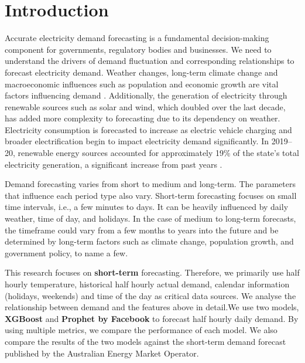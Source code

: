 \documentclass[mstat,12pt]{unswthesis}
\begin{document}


\afterpreface





%
%






\chapter{Introduction}\label{introduction}

Accurate electricity demand forecasting is a fundamental decision-making
component for governments, regulatory bodies and businesses. We need to
understand the drivers of demand fluctuation and corresponding
relationships to forecast electricity demand. Weather changes, long-term
climate change and macroeconomic influences such as population and
economic growth are vital factors influencing demand \cite{a2024_nem}.
Additionally, the generation of electricity through renewable sources
such as solar and wind, which doubled over the last decade, has added
more complexity to forecasting due to its dependency on
weather. Electricity
consumption is forecasted to increase as electric vehicle charging and
broader electrification begin to impact electricity demand
significantly. In 2019--20, renewable energy sources accounted for
approximately 19\% of the state's total electricity generation, a
significant increase from past years
\cite{nsw_epa_2021_energy_consumption}.

Demand forecasting varies from short to medium and long-term. The
parameters that influence each period type also vary. Short-term
forecasting focuses on small time intervals, i.e., a few minutes to
days. It can be heavily influenced by daily weather, time of day, and
holidays. In the case of medium to long-term forecasts, the timeframe
could vary from a few months to years into the future and be determined
by long-term factors such as climate change, population growth, and
government policy, to name a few.

This research focuses on \textbf{short-term} forecasting. Therefore, we
primarily use half hourly temperature, historical half hourly actual
demand, calendar information (holidays, weekends) and time of the day as
critical data sources. We analyse the relationship between demand and
the features above in detail.We use two models, \textbf{XGBoost} and
\textbf{Prophet by Facebook} to forecast half hourly daily demand. By
using multiple metrics, we compare the performance of each model. We
also compare the results of the two models against the short-term demand
forecast published by the Australian Energy Market Operator.
\end{document}
